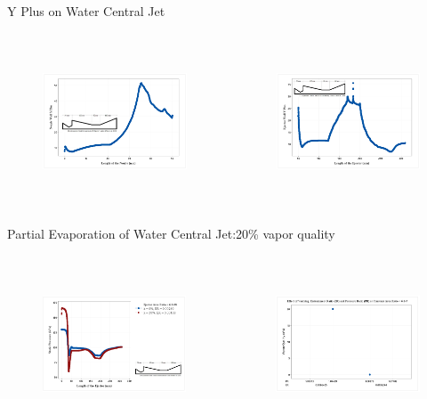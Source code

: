 \begin{frame}{Y Plus on Water Central Jet}
  \begin{columns}
    \begin{figure}
        \includegraphics[height=4.5cm]{images/wcjetnozyplus.png}
    \end{figure}
    \begin{figure}
        \includegraphics[height=4.5cm]{images/wcjetejecyplus.png}
    \end{figure}
  \end{columns}
\end{frame}

\begin{frame}{Partial Evaporation of Water Central Jet:20\% vapor quality}
\begin{columns}
        \begin{figure}
        \centering
        \includegraphics[height=4.5cm]{images/partialevap20percent.png}
    \end{figure}
        \begin{figure}
        \centering
        \includegraphics[height=4.5cm]{images/pevaperprinitial1.png}
    \end{figure}
\end{columns}
\end{frame}

